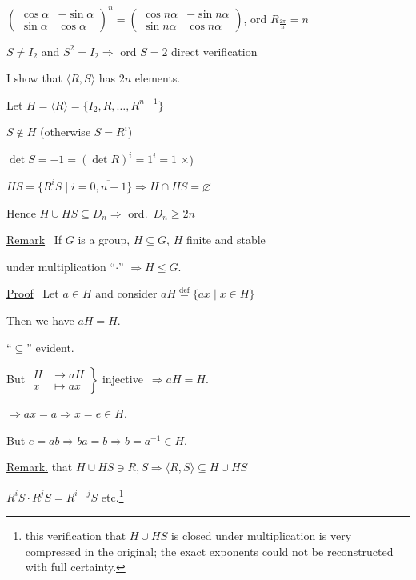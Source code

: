 \noindent{} \quad $\begin{pmatrix}\cos\alpha & -\sin\alpha\\ \sin\alpha & \cos\alpha\end{pmatrix}^{\!n} = \begin{pmatrix}\cos n\alpha & -\sin n\alpha\\ \sin n\alpha & \cos n\alpha\end{pmatrix}$, \quad ord $R_{\frac{2\pi}{n}} = n$

\bigskip
\noindent $S\neq I_2$ and $S^2=I_2 \Rightarrow$ ord $S=2$ \hfill direct verification

\bigskip
\bigskip
\noindent I show that $\langle R,S\rangle$ has $2n$ elements.

\noindent Let $H=\langle R\rangle = \{I_2,R,\ldots,R^{n-1}\}$

\noindent $S\notin H$ (otherwise $S=R^i$)

\noindent $\det S = -1 = (\det R)^i = 1^i = 1$ \quad $\times$)

\bigskip
\noindent $HS = \{R^iS \mid i=\overline{0,n-1}\} \Rightarrow H\cap HS=\varnothing$

\noindent Hence $H\cup HS \subseteq D_n \Rightarrow$ ord.\ $D_n\geq 2n$

\bigskip
\noindent\underline{Remark} \ If $G$ is a group, $H\subseteq G$, $H$ finite and stable

\noindent under multiplication ``$\cdot$'' $\Rightarrow H\leq G$.

\bigskip
\noindent\underline{Proof} \ Let $a\in H$ and consider $aH \overset{\text{def}}{=} \{ax \mid x\in H\}$

\noindent Then we have $aH=H$.

\noindent ``$\subseteq$'' evident.

\bigskip
\noindent But $\left.\begin{aligned} H&\to aH\\ x&\mapsto ax \end{aligned}\right\}$ injective\ $\Rightarrow aH=H$.

\bigskip
\noindent $\Rightarrow ax=a \Rightarrow x=e\in H.$

\noindent But $e=ab \Rightarrow ba=b \Rightarrow b=a^{-1}\in H.$

\bigskip
\noindent\underline{Remark.} that $H\cup HS \ni R,S \Rightarrow \langle R,S\rangle \subseteq H\cup HS$

\noindent $R^iS\cdot R^jS = R^{i-j}S$ etc.\footnote{this verification that $H\cup HS$ is closed under multiplication is very compressed in the original; the exact exponents could not be reconstructed with full certainty.}

